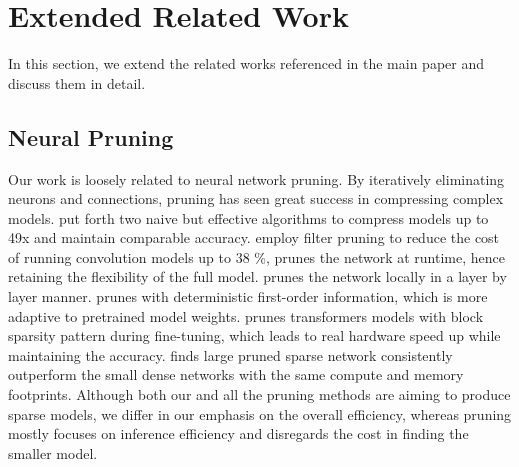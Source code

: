 


\section{Extended Related Work}
\label{app:related}
In this section, we extend the related works referenced in the main paper and discuss them in detail.

\subsection{Neural Pruning} 
Our work is loosely related to neural network pruning. By iteratively eliminating neurons and connections, pruning has seen great success in compressing complex models.\citet{han2015deep,han2015learning} put forth two naive but effective algorithms to compress models up to 49x and maintain comparable accuracy. \citet{li2016pruning} employ filter pruning to reduce the cost of running convolution models up to 38 $\%$, \citet{NIPS2017_a51fb975} prunes the network at runtime, hence retaining the flexibility of the full model. \citet{dong2017learning} prunes the network locally in a layer by layer manner.  \citet{sanh2020movement} prunes with deterministic first-order information, which is more adaptive to pretrained model weights. \citet{lagunas2021block} prunes transformers models with block sparsity pattern during fine-tuning, which leads to real hardware speed up while maintaining the accuracy. \citet{zhu2017prune} finds large pruned sparse network consistently outperform the small dense networks with the same compute and memory footprints. Although both our and all the pruning methods are aiming to produce sparse models, we differ in our emphasis on the overall efficiency, whereas pruning mostly focuses on inference efficiency and disregards the cost in finding the smaller model.\\

